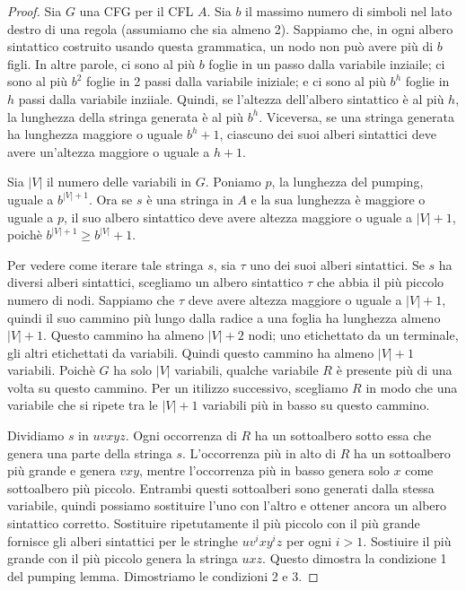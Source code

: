 \documentclass[12pt]{report}
\newcounter{lemma}
\begin{document}
\begin{proof}
Sia $G$ una CFG per il CFL $A$. Sia $b$ il massimo numero di simboli nel lato destro di una regola (assumiamo che sia almeno 2). Sappiamo che, in ogni albero sintattico costruito usando questa grammatica, un nodo non può avere più di $b$ figli. In altre parole, ci sono al più  $b$ foglie in un passo dalla variabile inziaile; ci sono al più $b^2$ foglie in 2 passi dalla variabile iniziale; e ci sono al più $b^h$ foglie in $h$ passi dalla variabile inziiale. Quindi, se l'altezza dell'albero sintattico è al più $h$, la lunghezza della stringa generata è al più $b^h$. Viceversa, se una stringa generata ha lunghezza maggiore o uguale $b^h + 1$, ciascuno dei suoi alberi sintattici deve avere un'altezza maggiore o uguale a $h + 1$.

Sia $|V|$ il numero delle variabili in $G$. Poniamo $p$, la lunghezza del pumping, uguale a $b^{|V| + 1}$. Ora se $s$ è una stringa in $A$ e la sua lunghezza è maggiore o uguale a  $p$, il suo albero sintattico deve avere altezza maggiore o uguale a $|V| + 1$, poichè $b^{|V| + 1} \geq b^{|V|} + 1$.

Per vedere come iterare tale stringa $s$, sia  $\tau$ uno dei suoi alberi sintattici. Se $s$ ha diversi alberi sintattici, scegliamo un albero sintattico $\tau$ che abbia il più piccolo numero di nodi. Sappiamo che $\tau$ deve avere altezza maggiore o uguale a $|V| + 1$, quindi il suo cammino più lungo dalla radice a una foglia ha lunghezza almeno $|V| + 1$. Questo cammino ha almeno $|V| + 2$ nodi; uno etichettato da un terminale, gli altri etichettati da variabili. Quindi questo cammino ha almeno $|V| + 1$ variabili. Poichè $G$ ha solo $|V|$ variabili, qualche variabile $R$ è presente più di una volta su questo cammino. Per un itilizzo successivo, scegliamo $R$ in modo che una variabile che si ripete tra le $|V| + 1$ variabili più in basso su questo cammino.

Dividiamo $s$ in $uvxyz$. Ogni occorrenza di $R$ ha un sottoalbero sotto essa che genera una parte della stringa $s$. L'occorrenza più in alto di $R$ ha un sottoalbero più grande e genera $vxy$, mentre l'occorrenza più in basso genera solo $x$ come sottoalbero più piccolo. Entrambi questi sottoalberi sono generati dalla stessa variabile, quindi possiamo sostituire l'uno con l'altro e ottener ancora un albero sintattico corretto. Sostituire ripetutamente il più piccolo con il più grande fornisce gli alberi sintattici per le stringhe $uv^ixy^iz$ per ogni $i > 1$. Sostiuire il più grande con il più piccolo genera la stringa $uxz$. Questo dimostra la condizione 1 del pumping lemma. Dimostriamo le condizioni 2 e 3.


\end{proof}
\end{document}
